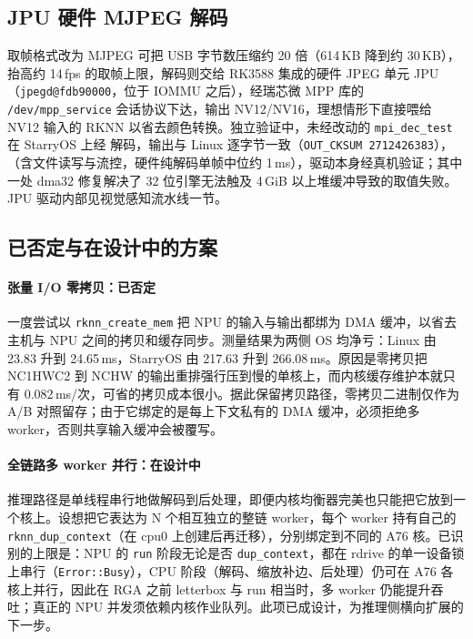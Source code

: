 \subsection{JPU 硬件 MJPEG 解码}

取帧格式改为 MJPEG 可把 USB 字节数压缩约 20 倍（614\,KB 降到约 30\,KB），抬高约 14\,fps 的取帧上限，解码则交给 RK3588 集成的硬件 JPEG 单元 JPU（\texttt{jpegd@fdb90000}，位于 IOMMU 之后），经瑞芯微 MPP 库的 \texttt{/dev/mpp\_service} 会话协议下达，输出 NV12/NV16，理想情形下直接喂给 NV12 输入的 RKNN 以省去颜色转换。独立验证中，未经改动的 \texttt{mpi\_dec\_test} 在 StarryOS 上经 解码，输出与 Linux 逐字节一致（\texttt{OUT\_CKSUM 2712426383}），（含文件读写与流控，硬件纯解码单帧中位约 1\,ms），驱动本身经真机验证；其中一处 dma32 修复解决了 32 位引擎无法触及 4\,GiB 以上堆缓冲导致的取值失败。JPU 驱动内部见视觉感知流水线一节。

\subsection{已否定与在设计中的方案}

\paragraph{张量 I/O 零拷贝：已否定}
一度尝试以 \texttt{rknn\_create\_mem} 把 NPU 的输入与输出都绑为 DMA 缓冲，以省去主机与 NPU 之间的拷贝和缓存同步。测量结果为两侧 OS 均净亏：Linux 由 23.83 升到 24.65\,ms，StarryOS 由 217.63 升到 266.08\,ms。原因是零拷贝把 NC1HWC2 到 NCHW 的输出重排强行压到慢的单核上，而内核缓存维护本就只有 0.082\,ms/次，可省的拷贝成本很小。据此保留拷贝路径，零拷贝二进制仅作为 A/B 对照留存；由于它绑定的是每上下文私有的 DMA 缓冲，必须拒绝多 worker，否则共享输入缓冲会被覆写。

\paragraph{全链路多 worker 并行：在设计中}
推理路径是单线程串行地做解码到后处理，即便内核均衡器完美也只能把它放到一个核上。设想把它表达为 N 个相互独立的整链 worker，每个 worker 持有自己的 \texttt{rknn\_dup\_context}（在 cpu0 上创建后再迁移），分别绑定到不同的 A76 核。已识别的上限是：NPU 的 \texttt{run} 阶段无论是否 \texttt{dup\_context}，都在 rdrive 的单一设备锁上串行（\texttt{Error::Busy}），CPU 阶段（解码、缩放补边、后处理）仍可在 A76 各核上并行，因此在 RGA 之前 letterbox 与 run 相当时，多 worker 仍能提升吞吐；真正的 NPU 并发须依赖内核作业队列。此项已成设计，为推理侧横向扩展的下一步。


